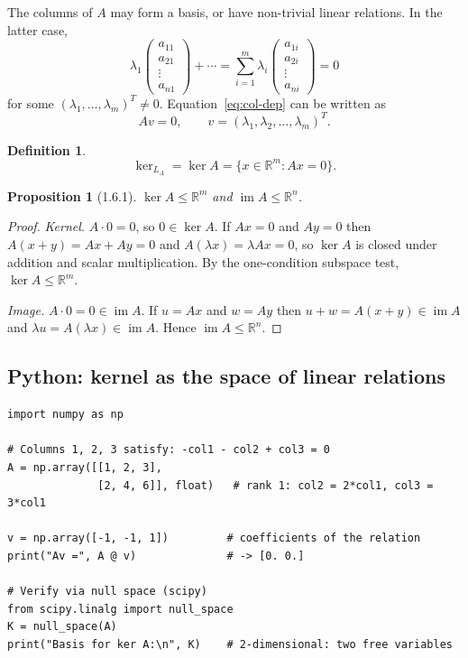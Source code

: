 \documentclass[11pt]{article}
\theoremstyle{definition}
\newtheorem{definition}{Definition}[section]
\theoremstyle{plain}
\newtheorem{proposition}{Proposition}[section]
\begin{document}
\noindent
The columns of $A$ may form a basis, or have non-trivial linear relations.
In the latter case,
\begin{equation}\label{eq:col-dep}
  \lambda_1 \begin{pmatrix}a_{11}\\a_{21}\\\vdots\\a_{n1}\end{pmatrix}
  + \cdots
  = \sum_{i=1}^{m} \lambda_i \begin{pmatrix}a_{1i}\\a_{2i}\\\vdots\\a_{ni}\end{pmatrix}
  = 0
\end{equation}
for some $(\lambda_1,\ldots,\lambda_m)^T \neq 0$.
Equation~\eqref{eq:col-dep} can be written as
\[
  Av = 0, \qquad v = (\lambda_1, \lambda_2, \ldots, \lambda_m)^T.
\]

\begin{definition}
  \[
    \ker_{L_A} = \ker A = \{x \in \mathbb{R}^m : Ax = 0\}.
  \]
\end{definition}

\begin{proposition}[1.6.1]
  $\ker A \leq \mathbb{R}^m$ \quad and \quad $\operatorname{im} A \leq \mathbb{R}^n$.
\end{proposition}
\begin{proof}
  \textit{Kernel.}
  $A \cdot 0 = 0$, so $0 \in \ker A$.
  If $Ax = 0$ and $Ay = 0$ then $A(x+y) = Ax+Ay = 0$ and $A(\lambda x) = \lambda Ax = 0$,
  so $\ker A$ is closed under addition and scalar multiplication.
  By the one-condition subspace test, $\ker A \leq \mathbb{R}^m$.

  \textit{Image.}
  $A \cdot 0 = 0 \in \operatorname{im} A$.
  If $u = Ax$ and $w = Ay$ then $u + w = A(x+y) \in \operatorname{im} A$
  and $\lambda u = A(\lambda x) \in \operatorname{im} A$.
  Hence $\operatorname{im} A \leq \mathbb{R}^n$.
\end{proof}

\subsection{Python: kernel as the space of linear relations}
\begin{lstlisting}
import numpy as np

# Columns 1, 2, 3 satisfy: -col1 - col2 + col3 = 0
A = np.array([[1, 2, 3],
              [2, 4, 6]], float)   # rank 1: col2 = 2*col1, col3 = 3*col1

v = np.array([-1, -1, 1])         # coefficients of the relation
print("Av =", A @ v)              # -> [0. 0.]

# Verify via null space (scipy)
from scipy.linalg import null_space
K = null_space(A)
print("Basis for ker A:\n", K)    # 2-dimensional: two free variables
\end{lstlisting}
\end{document}
